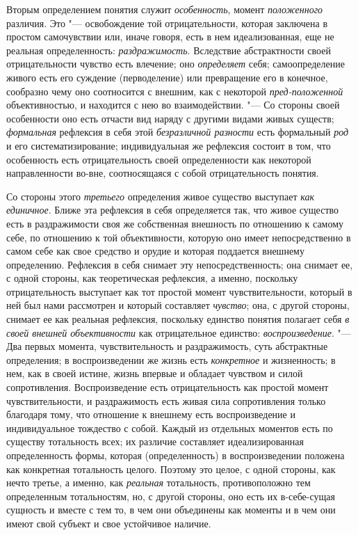 Вторым определением понятия служит
{\em особенность}, момент
{\em положенного}
различия. Это "--- освобождение той
отрицательности, которая заключена в простом самочувствии или, иначе
говоря, есть в нем идеализованная, еще не реальная определенность:
{\em раздражимость}.
Вследствие абстрактности своей отрицательности чувство есть
влечение; оно {\em определяет}
себя; самоопределение живого есть его суждение (перводеление)
или превращение его в конечное, сообразно чему оно соотносится с внешним,
как с некоторой {\em пред-положенной}
объективностью, и находится с нею во взаимодействии. "---
Со стороны своей особенности оно есть отчасти вид наряду с
другими видами живых существ;
{\em формальная}
рефлексия в себя этой
{\em безразличной разности}
есть формальный {\em род}
и его систематизирование; индивидуальная же рефлексия состоит
в том, что особенность есть отрицательность своей определенности как
некоторой направленности во-вне, соотносящаяся с собой отрицательность
понятия.

Со стороны этого
{\em третьего}
определения живое существо выступает
{\em как единичное}.
Ближе эта рефлексия в себя определяется так, что живое
существо есть в раздражимости своя же собственная внешность по отношению к
самому себе, по отношению к той объективности, которую оно имеет
непосредственно в самом себе как свое средство и орудие и которая поддается
внешнему определению. Рефлексия в себя снимает эту непосредственность; она
снимает ее, с одной стороны, как теоретическая рефлексия, а именно,
поскольку отрицательность выступает как тот простой момент
чувствительности, который в ней был нами рассмотрен и который составляет
{\em чувство}; она, с
другой стороны, снимает ее как реальная рефлексия, поскольку единство
понятия полагает себя {\em в своей
внешней объективности} как отрицательное единство:
{\em воспроизведение}. "---
Два первых момента, чувствительность и раздражимость, суть
абстрактные определения; в воспроизведении же жизнь есть
{\em конкретное} и
жизненность; в нем, как в своей истине, жизнь впервые и обладает чувством и
силой сопротивления. Воспроизведение есть отрицательность как простой
момент чувствительности, и раздражимость есть живая сила сопротивления
только благодаря тому, что отношение к внешнему есть воспроизведение и
индивидуальное тождество с собой. Каждый из отдельных
моментов есть по существу тотальность всех; их различие составляет
идеализированная определенность формы, которая (определенность) в
воспроизведении положена как конкретная тотальность целого. Поэтому это
целое, с одной стороны, как нечто третье, а именно, как
{\em реальная}
тотальность, противоположно тем определенным тотальностям,
но, с другой стороны, оно есть их в-себе-сущая сущность и вместе с тем то,
в чем они объединены как моменты и в чем они имеют свой субъект и свое
устойчивое наличие.

